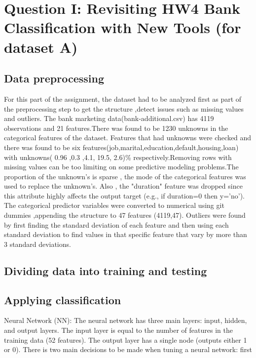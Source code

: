 \section{Question I: Revisiting HW4 Bank Classification with New Tools (for dataset A)}
\subsection{Data preprocessing}
For this part of the assignment, the dataset had to be analyzed first as part of the preprocessing step to get the structure ,detect issues such as missing values and outliers. The bank marketing data(bank-additional.csv) has 4119 observations and 21 features.There was found to be 1230 unknowns in the categorical features of the dataset. Features that had unknowns were checked and there was found to be six features(job,marital,education,default,housing,loan) with unknowns( 0.96 ,0.3 ,4.1,  19.5, 2.6)\% respectively.Removing rows with missing values can be too limiting on some predictive modeling problems.The proportion of the unknown's is sparse , the mode of the categorical features was used to replace the unknown's. Also , the "duration" feature was dropped since this attribute highly affects the output target (e.g., if duration=0 then y='no').
The categorical predictor variables  were converted  to numerical using git dummies ,appending the structure to 47 features (4119,47).
Outliers were found by first finding the standard deviation of each feature and then using each standard deviation to find values in that specific feature that vary by more than 3 standard deviations. 

\subsection{Dividing data into training and testing}
 

\subsection{Applying classification}


Neural Network (NN): The neural network has three main layers: input, hidden, and output layers. The input layer is equal to the number of features in the training data (52 features). The output layer has a single node (outputs either 1 or 0). There is two main decisions to be made when tuning a neural network: first


